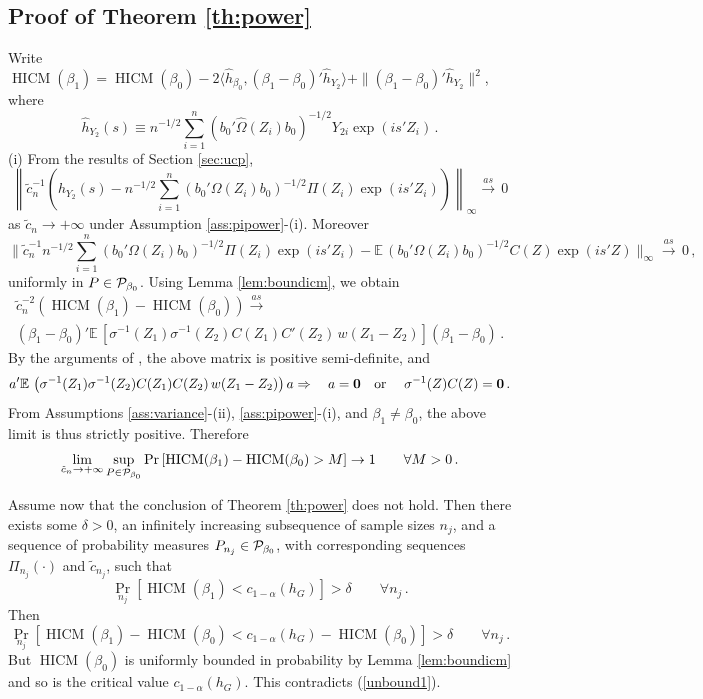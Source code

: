 \documentclass[12pt]{article}
\newcommand{\E}{\operatorname{E}}
\newcommand{\1}{\mathbf{1}}
\newcommand{\HICM}{\operatorname{HICM}}
\def\E{\mathbb{E}\,}
\newcommand{\mO}{\mbox{\bf 0}}
\newcommand{\ip}[2]{\langle #1,#2 \rangle}
\newcommand{\cvas}{\mbox{$\stackrel{as}{\longrightarrow}\,$}}
\begin{document}
\subsection{Proof of Theorem \ref{th:power}}
Write
$
 \HICM (\beta_{1})  =
 \HICM (\beta_{0})
-  2 \ip{\widehat{h}_{\beta_0}}{ \left(\beta_1 -
 \beta_0\right)'  \widehat{h}_{Y_2} }
+  \| \left(\beta_1 -  \beta_0\right)' \widehat{h}_{Y_2} \|^{2}
$,
where
\[
\widehat{h}_{Y_2}(s)   \equiv
n^{-1/2} \sum_{i=1}^{n}{
\left(b_0' \widehat{\Omega}(Z_i) b_0\right)^{-1/2} Y_{2i} \exp(i s'Z_{i})}
\, .
\]
\noindent
(i) From the results of Section \ref{sec:ucp},
\[
\left\| \tilde{c}_{n}^{-1} \left(  \widehat{h}_{Y_2}(s)  -
n^{-1/2} \sum_{i=1}^{n}{ \left(b_0' {\Omega}(Z_i) b_0\right)^{-1/2}
\Pi(Z_{i}) \exp(i s'Z_{i})} \right)  \right\|_{\infty}  \cvas 0
\]
as $\tilde{c}_{n} \rightarrow + \infty$  under Assumption
\ref{ass:pipower}-(i). Moreover
\[
\| \tilde{c}_{n}^{-1}
 n^{-1/2} \sum_{i=1}^{n}{ \left(b_0' {\Omega}(Z_i) b_0\right)^{-1/2}
\Pi(Z_{i}) \exp(i s'Z_{i})}
-
\E \left(b_0' {\Omega}(Z_i) b_0\right)^{-1/2} C(Z) \exp(i s'Z)
 \|_{\infty}
\cvas 0
\, ,
\]
uniformly in $P \in {\cal P}_{\beta_0}$.
Using  Lemma \ref{lem:boundicm}, we obtain
\begin{multline*}
\tilde{c}_{n}^{-2} \left( \HICM (\beta_{1}) - \HICM (\beta_{0}) \right)
 \cvas
\\
\left(\beta_1 -  \beta_0\right)'
\E \left[ \sigma^{-1}(Z_1) \sigma^{-1}(Z_2)
C(Z_{1})  C'(Z_{2}) \,
  w(Z_{1}-Z_{2})\right]
   \left(\beta_1 -  \beta_0\right)
\, .
\end{multline*}
By the arguments of \citet[Theorem 1]{Bierens82}, the above matrix is
positive semi-definite, and
\[
 a' \E \left( \sigma^{-1}(Z_1) \sigma^{-1}(Z_2) C(Z_{1}) C(Z_{2})  \,
 w(Z_{1}-Z_{2})\right) a \Rightarrow \quad a
= \mO \quad \mbox{or } \quad  \sigma^{-1}(Z)  C(Z) = \mO
\, .
\]
From Assumptions \ref{ass:variance}-(ii), \ref{ass:pipower}-(i), and
$\beta_1 \neq \beta_0$, the above limit is thus strictly positive.  Therefore
\begin{equation}
\lim_{\tilde{c}_{n} \rightarrow + \infty}
\sup_{P \in {\cal P}_{\beta_0}} \Pr \left[  \HICM (\beta_{1}) - \HICM
(\beta_{0})  > M \right] \rightarrow 1 \qquad \forall M >0
\, .
\label{unbound1}
\end{equation}

Assume now that the conclusion of Theorem \ref{th:power} does not
hold. Then there exists some $\delta>0$, an infinitely increasing
subsequence of sample sizes $n_{j}$, and a sequence of probability
measures $P_{n_{j}} \in {\cal P}_{\beta_{0}}$, with corresponding
sequences  $\Pi_{n_j}(\cdot)$ and
$\tilde{c}_{n_{j}}$, such that
\[
\Pr_{n_{j}} \left[ \HICM (\beta_{1}) < c_{1-\alpha} (h_{{G}}) \right]
> \delta
\qquad \forall n_{j}
\, .
\]
Then
\[
\Pr_{n_{j}} \left[ \HICM (\beta_{1}) - \HICM (\beta_{0})  < c_{1-\alpha} (h_{{G}})  - \HICM (\beta_{0})
\right] > \delta \qquad \forall n_{j}
\, .
\]
But  $\HICM (\beta_{0})$  is uniformly bounded in probability  by Lemma \ref{lem:boundicm}
and so is the critical value $c_{1-\alpha} (h_{{G}})$.
This contradicts (\ref{unbound1}).
\end{document}
